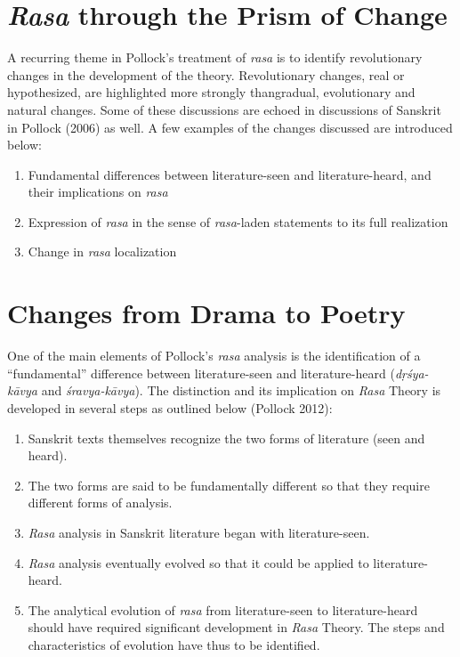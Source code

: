 \newpage

\section*{\textsl{Rasa} through the Prism of Change}

A recurring theme in Pollock’s treatment of \textsl{rasa} is to identify revolutionary changes in the development of the theory. Revolutionary changes, real or hypothesized, are highlighted more strongly than\break gradual, evolutionary and natural changes. Some of these discussions are echoed in discussions of Sanskrit in Pollock (2006) as well. A few examples of the changes discussed are introduced below:
\begin{enumerate}
\itemsep=0pt
\item Fundamental differences between literature-seen and litera\-ture-heard, and their implications on \textsl{rasa }
\item Expression of \textsl{rasa} in the sense of \textsl{rasa}-laden statements to its full realization
\item Change in \textsl{rasa} localization
\end{enumerate}

\section*{Changes from Drama to Poetry}

One of the main elements of Pollock’s \textsl{rasa} analysis is the identification of a “fundamental” difference between literature-seen and literature-heard (\textsl{dṛśya-kāvya} and \textsl{śravya-kāvya}). The distinction and its implication on \textsl{Rasa} Theory is developed in several steps as outlined below (Pollock 2012):
\begin{enumerate}
\itemsep=1pt
\item Sanskrit texts themselves recognize the two forms of literature (seen and heard). 
\item The two forms are said to be fundamentally different so that they require different forms of analysis.
\item \textsl{Rasa }analysis in Sanskrit literature began with literature-seen.
\item \textsl{Rasa }analysis eventually evolved so that it could be applied to literature-heard.
\item The analytical evolution of \textsl{rasa} from literature-seen to litera\-ture-heard should have required significant development in \textsl{Rasa} Theory. The steps and characteristics of evolution have thus to be identified.
\end{enumerate}

